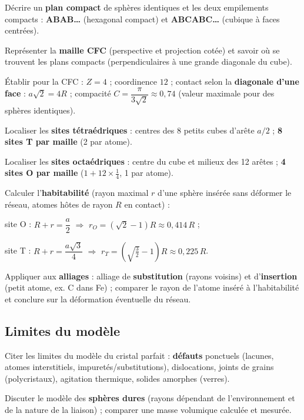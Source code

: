 \documentclass[11pt,a4paper]{article}
\begin{document}
\begin{savoir}
  \item Décrire un \textbf{plan compact} de sphères identiques et les deux empilements compacts :
        \textbf{ABAB\dots} (hexagonal compact) et \textbf{ABCABC\dots} (cubique à faces centrées).
  \item Représenter la \textbf{maille CFC} (perspective et projection cotée) et savoir où se
        trouvent les plans compacts (perpendiculaires à une grande diagonale du cube).
  \item Établir pour la CFC : $Z=4$ ; coordinence $12$ ; contact selon la
        \textbf{diagonale d'une face} : $a\sqrt2 = 4R$ ; compacité
        $C=\dfrac{\pi}{3\sqrt2}\approx 0{,}74$ (valeur maximale pour des sphères identiques).
  \item Localiser les \textbf{sites tétraédriques} : centres des 8 petits cubes d'arête $a/2$ ;
        \textbf{8 sites T par maille} (2 par atome).
  \item Localiser les \textbf{sites octaédriques} : centre du cube et milieux des 12 arêtes ;
        \textbf{4 sites O par maille} ($1+12\times\frac14$, 1 par atome).
  \item Calculer l'\textbf{habitabilité} (rayon maximal $r$ d'une sphère insérée sans déformer
        le réseau, atomes hôtes de rayon $R$ en contact) :
    \begin{savoir}
      \item site O : $R + r = \dfrac a2$ $\Rightarrow$ $r_O = (\sqrt2-1)R \approx 0{,}414\,R$ ;
      \item site T : $R + r = \dfrac{a\sqrt3}{4}$ $\Rightarrow$
            $r_T = \left(\sqrt{\tfrac32}-1\right)R \approx 0{,}225\,R$.
    \end{savoir}
  \item Appliquer aux \textbf{alliages} : alliage de \textbf{substitution} (rayons voisins) et
        d'\textbf{insertion} (petit atome, ex. C dans Fe) ; comparer le rayon de l'atome inséré à
        l'habitabilité et conclure sur la déformation éventuelle du réseau.
\end{savoir}

\subsection{Limites du modèle}

\begin{savoir}
  \item Citer les limites du modèle du cristal parfait : \textbf{défauts} ponctuels (lacunes,
        atomes interstitiels, impuretés/substitutions), dislocations, joints de grains
        (polycristaux), agitation thermique, solides amorphes (verres).
  \item Discuter le modèle des \textbf{sphères dures} (rayons dépendant de l'environnement et de
        la nature de la liaison) ; comparer une masse volumique calculée et mesurée.
\end{savoir}
\end{document}
